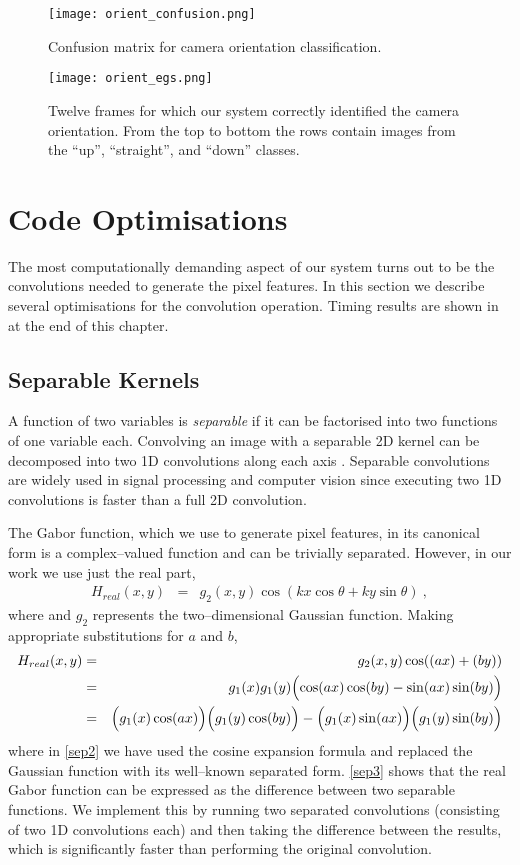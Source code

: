 \begin{figure}[htp]
\centering
\texttt{[image: orient\_confusion.png]}
\caption{Confusion matrix for camera orientation classification.}
\label{fig:orient-confusion}
\end{figure}

\begin{figure}[htp]
\centering
\texttt{[image: orient\_egs.png]}
\caption{Twelve frames for which our system correctly identified the
  camera orientation. From the top to bottom the rows contain images
  from the ``up'', ``straight'', and ``down'' classes.}
\label{fig:eg-orients}
\end{figure}


\section{Code Optimisations}
The most computationally demanding aspect of our system turns out to
be the convolutions needed to generate the pixel features. In this
section we describe several optimisations for the convolution
operation. Timing results are shown in  at the
end of this chapter.

\subsection{Separable Kernels}
A function of two variables is \textit{separable} if it can be
factorised into two functions of one variable each. Convolving an
image with a separable 2D kernel can be decomposed into two 1D
convolutions along each axis \cite{Lindeberg93}. Separable
convolutions are widely used in signal processing and computer vision
since executing two 1D convolutions is faster than a full 2D
convolution. 

The Gabor function, which we use to generate pixel features, in its
canonical form is a complex--valued function and can be trivially
separated. However, in our work we use just the real part,
\begin{eqnarray}
  H_{real}(x,y) & = & g_2(x,y) \cos(kx\cos\theta + ky\sin\theta) ~,
\end{eqnarray}
where and $g_2$ represents the two--dimensional Gaussian
function. Making appropriate substitutions for $a$ and $b$,
\begin{eqnarray}
  H_{real}(x,y) & = & g_2(x,y) \cos((ax) + (by))\\
  & = & g_1(x)g_1(y) \Bigl(\cos (ax)\cos (by) - \sin (ax)\sin (by)
  \Bigr) \label{sep2}\\
  & = & \Bigl(g_1(x)\cos (ax)\Bigr) \Bigl(g_1(y)\cos (by)\Bigr)
  - \Bigl(g_1(x)\sin (ax)\Bigr)\Bigl(g_1(y)\sin (by)\Bigr)
  \label{sep3}
\end{eqnarray}
where in \eqref{sep2} we have used the cosine expansion formula and
replaced the Gaussian function with its well--known separated
form. \eqref{sep3} shows that the real Gabor function can be expressed
as the difference between two separable functions. We implement this
by running two separated convolutions (consisting of two 1D
convolutions each) and then taking the difference between the results,
which is significantly faster than performing the original
convolution.

